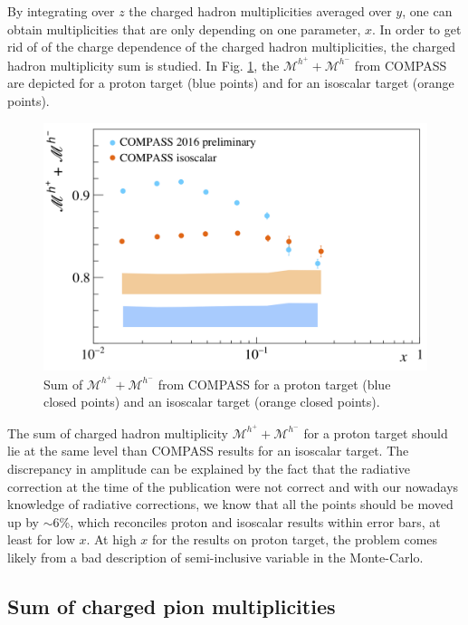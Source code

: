 By integrating over $z$ the charged hadron multiplicities averaged over $y$, one can obtain multiplicities that are only depending on one parameter, $x$. In order to get rid of of the charge dependence of the charged hadron multiplicities, the charged hadron multiplicity sum is studied. In Fig. \ref{pic:hsum}, the $\mathscr{M}^{h^+}+\mathscr{M}^{h^-}$ from COMPASS are depicted for a proton target (blue points) and for an isoscalar target (orange points).

\begin{figure}[!h]
  \centering
	\includegraphics[scale=0.5]{./gfx/hs.png}
	\caption{Sum of $\mathscr{M}^{h^+}+\mathscr{M}^{h^-}$ from COMPASS for a proton target (blue closed points) and an isoscalar target (orange closed points).}
	\label{pic:hsum}
\end{figure}

The sum of charged hadron multiplicity $\mathscr{M}^{h^+}+\mathscr{M}^{h^-}$ for a proton target should lie at the same level than COMPASS results for an isoscalar target. The discrepancy in amplitude can be explained by the fact that the radiative correction at the time of the publication were not correct and with our nowadays knowledge of radiative corrections, we know that all the points should be moved up by $\sim$6\%, which reconciles proton and isoscalar results within error bars, at least for low $x$. At high $x$ for the results on proton target, the problem comes likely from a bad description of semi-inclusive variable in the Monte-Carlo.

\newpage

\subsection{Sum of charged pion multiplicities}

